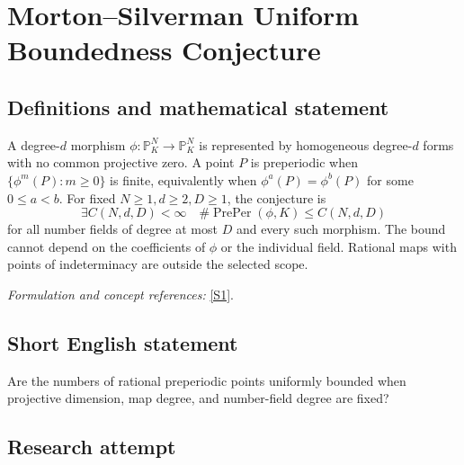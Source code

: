 \documentclass[11pt,a4paper]{article}
\newcommand{\PP}{\mathbb P}
\newcommand{\sref}[2]{\hyperlink{source:#1:#2}{[S#2]}}
\newif\ifshowcatalogue
\newcommand{\cataloguescope}[1]{\ifshowcatalogue
 \paragraph{Exact scope in the supplied catalogue.}
 \begin{quote}\small #1\end{quote}\fi}
\begin{document}
\setcounter{section}{0}
\clearpage
\section*{\texorpdfstring{Morton–Silverman Uniform Boundedness Conjecture}{Morton–Silverman Uniform Boundedness Conjecture}}\label{statement}
\subsection{Definitions and mathematical statement}
A degree-$d$ morphism $\phi:\PP^N_K\to\PP^N_K$ is represented by homogeneous degree-$d$ forms with no common projective zero. A point $P$ is preperiodic when $\{\phi^m(P):m\ge0\}$ is finite, equivalently when $\phi^a(P)=\phi^b(P)$ for some $0\le a<b$. For fixed $N\ge1,d\ge2,D\ge1$, the conjecture is
\[
 \exists C(N,d,D)<\infty\quad
 \#\operatorname{PrePer}(\phi,K)\le C(N,d,D)
\]
for all number fields of degree at most $D$ and every such morphism. The bound cannot depend on the coefficients of $\phi$ or the individual field. Rational maps with points of indeterminacy are outside the selected scope.
\par\smallskip\textit{Formulation and concept references:} \sref{statement}{1}.
\cataloguescope{For all fixed integers N>=1, d>=2 and D>=1, there exists a finite constant C(N,d,D) such that for every number field K with [K:Q]<=D and every degree-d K-morphism phi:P\textasciicircum{}N\_K->P\textasciicircum{}N\_K, the set of K-rational preperiodic points has cardinality at most C(N,d,D). A point is preperiodic when its forward orbit under phi is finite. The morphism is everywhere defined, equivalently given by homogeneous degree-d forms with no common projective zero. The bound is independent of the field and map except for N,d,D; no effective formula or classification is required.}
\subsection{Short English statement}
Are the numbers of rational preperiodic points uniformly bounded when projective dimension, map degree, and number-field degree are fixed?
\subsection{Research attempt}
\end{document}
